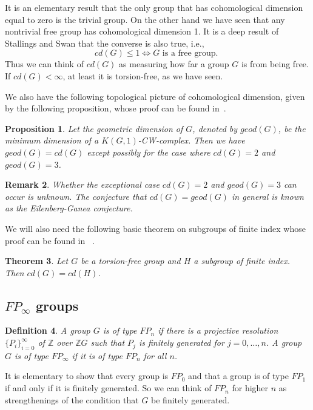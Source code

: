 \documentclass{amsart}
\newtheorem{thm}{Theorem}[section]
\newtheorem{prop}[thm]{Proposition}
\newtheorem{rem}[thm]{Remark}
\newtheorem{defn}[thm]{Definition}
\begin{document}
It is an elementary result that the only group that has cohomological 
dimension equal to zero 
is the trivial group. On the other hand we have seen that any nontrivial
free group has cohomological dimension 1. It is a deep result of Stallings
and Swan that the converse is also true, i.e.,
$$
cd(G) \leq 1 \iff G \text{ is a free group. }
$$
Thus we can think of $cd(G)$ as measuring how far a group $G$ is from being
free. If $cd(G) < \infty$, at least it is torsion-free, as we have seen.

We also have the following topological picture of cohomological dimension,
given by the following proposition, whose proof can be found in~\cite{Brown}.

\begin{prop}
Let the geometric dimension of $G$, denoted by $geod(G)$,
 be the minimum dimension of a $K(G,1)$-CW-complex. 
Then we have $geod(G)=cd(G)$ except possibly for the case
where $cd(G)=2$ and $geod(G)=3$.
\end{prop}

\begin{rem} Whether the exceptional case $cd(G)=2$ and $geod(G)=3$ can
occur is unknown. The conjecture that $cd(G)=geod(G)$ in general is known
as the Eilenberg-Ganea conjecture.
\end{rem}

We will also need the following basic theorem on subgroups of finite
index whose proof can be found in ~\cite{Brown}.

\begin{thm}
\label{thm: cdfinindex}
Let $G$ be a torsion-free group and $H$ a subgroup of finite index.
Then $cd(G)=cd(H)$.
\end{thm}

\subsection{$FP_\infty$ groups}

\begin{defn}
A group $G$ is of type $FP_n$ if there is a projective resolution
$\{ P_i \}_{i=0}^\infty$ of $\mathbb{Z}$ over $\mathbb{Z}G$ such that 
$P_j$ is finitely
generated for $j=0,\dots,n$. A group $G$ is of type $FP_\infty$ if it is
of type $FP_n$ for all $n$.
\end{defn}

It is elementary to show that every group is $FP_0$ and that a group
is of type $FP_1$ if and only if it is finitely generated.
So we can think of $FP_n$ for higher $n$ as strengthenings 
of the condition that $G$ be finitely generated. 
\end{document}
